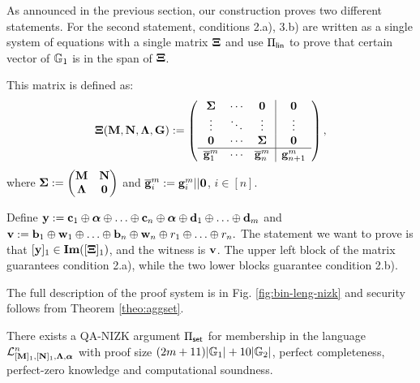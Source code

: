 As announced in the previous section, our construction proves two different statements. For the second statement, conditions 2.a), 3.b) are written as a single system of equations with a single matrix $\mathbf{{\Xi}}$ and use $\Pi_{\mathsf{lin}}$ to prove that certain vector of $\mathbb{G}_1$ is in the span of $\mathbf{{\Xi}}$.

This matrix is defined as:
$$\mathbf{{\Xi}}(\mathbf{{M}},\mathbf{{N}},\mathbf{{\Lambda}},\mathbf{{G}}):=
\left(\begin{array}{ccc|ccc}
\mathbf{{\Sigma}}             & \cdots & \mathbf{{0}}                  & \mathbf{{0}} \\
\vdots                    & \ddots & \vdots                    & \vdots   \\
\mathbf{{0}}                  & \cdots & \mathbf{{\Sigma}}             & \mathbf{{0}} \\
\hline
\overline{\mathbf{g}}_1^{m} & \cdots & \overline{\mathbf{g}}_n^{m} & \mathbf{g}_{n+1}^{m}
\end{array}\right),
$$ where $\mathbf{{\Sigma}}:=\begin{pmatrix}
    \mathbf{{M}}       & \mathbf{{N}}\\
    \mathbf{{\Lambda}} & \mathbf{{0}}
\end{pmatrix}$ and
 $\overline{\mathbf{g}}_i^{m}:=\mathbf{g}_i^{m}||\mathbf{0}$, $i\in[n]$. 
 
Define $\mathbf{y}:=\mathbf{c}_1\oplus {\boldsymbol \alpha}
\oplus \ldots \oplus \mathbf{c}_n\oplus {\boldsymbol \alpha} 
\oplus \mathbf{d}_1 \oplus  \ldots \oplus  \mathbf{d}_m$
and 
 $\mathbf{v}:=\mathbf{b}_1\oplus \mathbf{w}_1 \oplus \ldots \oplus \mathbf{b}_n\oplus \mathbf{w}_n \oplus r_1 \oplus \ldots \oplus r_n.$ The statement we want to prove is that $[\mathbf{y}]_1 \in \mathbf{Im}([\mathbf{{\Xi}}]_1)$, and the witness is $\mathbf{v}$. The upper left block of the matrix guarantees condition 2.a), while the two lower blocks guarantee 
condition 2.b).

The full description of the proof system is in Fig. \ref{fig:bin-leng-nizk} and security follows from Theorem \ref{theo:aggset}.


\begin{theorem} \label{theo:aggset} There exists a QA-NIZK argument $\Pi_{\mathsf{set}}$ for membership in the language $\mathcal{L}_{[\mathbf{{M}}]_1,[\mathbf{{N}}]_1,\mathbf{{\Lambda}},{\boldsymbol \alpha}}^n$ with proof size  $(2{m}+11)|\mathbb{G}_1|+10|\mathbb{G}_2|$, perfect completeness, perfect-zero knowledge and computational soundness. 
\end{theorem}

